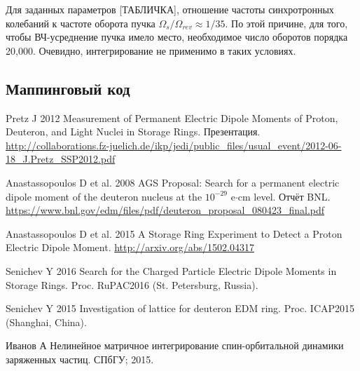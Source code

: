 \documentclass{article}
\begin{document}
	Для заданных параметров [ТАБЛИЧКА], отношение частоты синхротронных колебаний к частоте оборота пучка $\Omega_s/\Omega_{rev} \approx 1/35$. По этой причине, для того, чтобы ВЧ-усреднение пучка имело место, необходимое число оборотов порядка 20,000. Очевидно, интегрирование не применимо в таких условиях.
	\subsection{Маппинговый код}
	
	\clearpage
	\begin{thebibliography}{99}
		Pretz J 2012 Measurement of Permanent Electric Dipole Moments of Proton, Deuteron, and Light Nuclei in Storage Rings. Презентация. \url{http://collaborations.fz-juelich.de/ikp/jedi/public_files/usual_event/2012-06-18_J.Pretz_SSP2012.pdf}
		
		Anastassopoulos D et al. 2008 AGS Proposal: Search for a permanent electric dipole moment of the deuteron nucleus at the $10^{-29}$ e$\cdot$cm level. Отчёт BNL. \url{https://www.bnl.gov/edm/files/pdf/deuteron_proposal_080423_final.pdf}
		
		Anastassopoulos D et al. 2015 A Storage Ring Experiment to Detect a Proton Electric Dipole Moment. \url{http://arxiv.org/abs/1502.04317}
		
		Senichev Y 2016 Search for the Charged Particle Electric Dipole Moments in Storage Rings. Proc. RuPAC2016 (St. Petersburg, Russia).

		Senichev Y 2015 Investigation of lattice for deuteron EDM ring. Proc. ICAP2015 (Shanghai, China).
		
		Иванов А Нелинейное матричное интегрирование спин-орбитальной динамики заряженных частиц. СПбГУ; 2015.
	\end{thebibliography}
\end{document}
